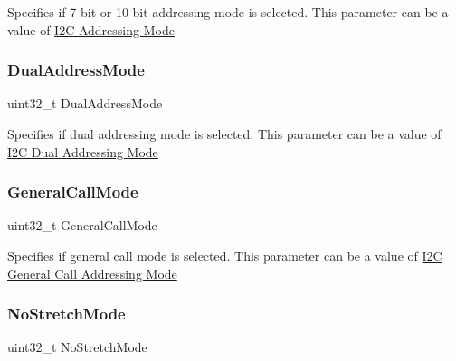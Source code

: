 Specifies if 7-\/bit or 10-\/bit addressing mode is selected. This parameter can be a value of \hyperlink{group___i2_c___a_d_d_r_e_s_s_i_n_g___m_o_d_e}{I2C Addressing Mode} \mbox{\label{struct_i2_c___init_type_def_aabb4e156aa4af60dfaf591419e9b1a07}} 
\subsubsection{\texorpdfstring{Dual\+Address\+Mode}{DualAddressMode}}
{\footnotesize\ttfamily uint32\+\_\+t Dual\+Address\+Mode}

Specifies if dual addressing mode is selected. This parameter can be a value of \hyperlink{group___i2_c___d_u_a_l___a_d_d_r_e_s_s_i_n_g___m_o_d_e}{I2C Dual Addressing Mode} \mbox{\label{struct_i2_c___init_type_def_afc70f58c0935194064d720779fbf22b5}} 
\subsubsection{\texorpdfstring{General\+Call\+Mode}{GeneralCallMode}}
{\footnotesize\ttfamily uint32\+\_\+t General\+Call\+Mode}

Specifies if general call mode is selected. This parameter can be a value of \hyperlink{group___i2_c___g_e_n_e_r_a_l___c_a_l_l___a_d_d_r_e_s_s_i_n_g___m_o_d_e}{I2C General Call Addressing Mode} \mbox{\label{struct_i2_c___init_type_def_a47971fd08a9784eddaa3d83fb998030c}} 
\subsubsection{\texorpdfstring{No\+Stretch\+Mode}{NoStretchMode}}
{\footnotesize\ttfamily uint32\+\_\+t No\+Stretch\+Mode}

